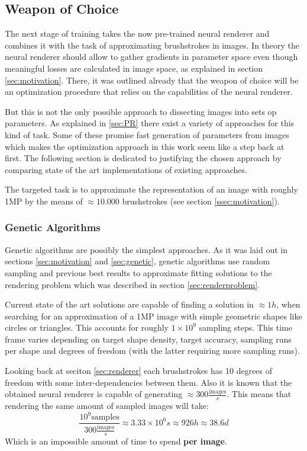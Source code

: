 \subsection{Weapon of Choice}
The next stage of training takes the now pre-trained neural renderer and combines it with the task of approximating brushstrokes in images.
In theory the neural renderer should allow to gather gradients in parameter space even though meaningful losses are calculated in image space, as explained in section
\ref{sec:motivation}.
There, it was outlined already that the weapon of choice will be an optimization procedure that relies on the capabilities of the neural renderer.

But this is not the only possible approach to dissecting images into sets op parameters.
As explained in \ref{sec:PR} there exist a variety of approaches for this kind of task.
Some of these promise fast generation of parameters from images which makes the optimization approach in this work seem like a step back at first.
The following section is dedicated to justifying the chosen approach by comparing state of the art implementations of existing approaches.

The targeted task is to approximate the representation of an image with roughly 1MP by the means of $\approx 10.000$ brushstrokes (see section \ref{ssec:motivation}).

\subsubsection{Genetic Algorithms}
Genetic algorithms are possibly the simplest approaches.
As it was laid out in sections \ref{sec:motivation} and \ref{sec:genetic}, genetic algorithms use random sampling and previous best results to approximate fitting solutions to the rendering problem which was described in section \ref{sec:renderproblem}.

Current state of the art solutions are capable of finding a solution in $\approx 1h$, when searching for an approximation of a 1MP image with simple geometric shapes like circles or triangles.
This accounts for roughly $1 \times 10^{9}$ sampling steps.
This time frame varies depending on target shape density, target accuracy, sampling runs per shape and degrees of freedom (with the latter requiring more sampling runs).

Looking back at seciton \ref{sec:renderer} each brushstrokes has 10 degrees of freedom with some inter-dependencies between them.
Also it is known that the obtained neural renderer is capable of generating $\approx 300 \frac{\text{images}}{s}$.
This means that rendering the same amount of sampled images will take:
$$
\frac{10^{9} \text{samples}}{300 \frac{\text{images}}{s}} \approx 3.33 \times 10^{6} s
\approx 926 h \approx 38.6 d
$$
Which is an impossible amount of time to spend \textbf{per image}.


